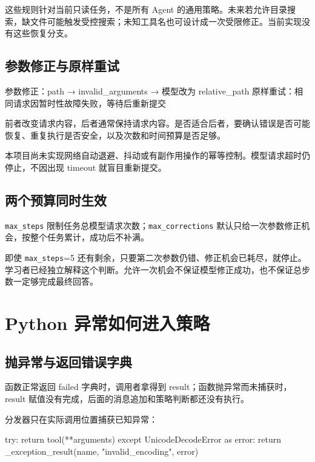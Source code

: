 \documentclass[UTF8,zihao=-4,fontset=fandol]{ctexart}
\begin{document}
这些规则针对当前只读任务，不是所有 Agent 的通用策略。未来若允许目录搜索，缺文件可能触发受控搜索；未知工具名也可设计成一次受限修正。当前实现没有这些恢复分支。

\subsection{参数修正与原样重试}

\begin{Code}
参数修正：path → invalid_arguments → 模型改为 relative_path
原样重试：相同请求因暂时性故障失败，等待后重新提交
\end{Code}

前者改变请求内容，后者通常保持请求内容。是否适合后者，要确认错误是否可能恢复、重复执行是否安全，以及次数和时间预算是否足够。

本项目尚未实现网络自动退避、抖动或有副作用操作的幂等控制。模型请求超时仍停止，不因出现 timeout 就盲目重新提交。

\subsection{两个预算同时生效}

\nolinkurl{max_steps} 限制任务总模型请求次数；\nolinkurl{max_corrections} 默认只给一次参数修正机会，按整个任务累计，成功后不补满。

即使 \nolinkurl{max_steps}=5 还有剩余，只要第二次参数仍错、修正机会已耗尽，就停止。学习者已经独立解释这个判断。允许一次机会不保证模型修正成功，也不保证总步数一定够完成最终回答。

\section{Python 异常如何进入策略}

\subsection{抛异常与返回错误字典}

函数正常返回 failed 字典时，调用者拿得到 result；函数抛异常而未捕获时，result 赋值没有完成，后面的消息追加和策略判断都还没有执行。

分发器只在实际调用位置捕获已知异常：

\begin{Code}
try:
    return tool(**arguments)
except UnicodeDecodeError as error:
    return _exception_result(name, "invalid_encoding", error)
\end{Code}
\end{document}
